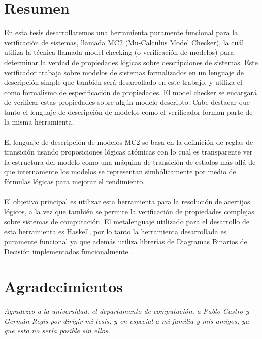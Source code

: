 % 
% 
%
\chapter*{Resumen}

\noindent En esta tesis desarrollaremos una herramienta puramente funcional para la verificación de sistemas, llamada MC2 (Mu-Calculus Model Checker), la cuál utiliza la técnica llamada model checking (o verificación de modelos) para determinar la verdad de propiedades lógicas sobre descripciones de sistemas. Este verificador trabaja sobre modelos de sistemas formalizados en un lenguaje de descripción simple que también será desarrollado en este trabajo, y utiliza el {\mucalculo} como formalismo de especificación de propiedades. El model checker se encargará de verificar estas propiedades sobre algún modelo descripto. Cabe destacar que tanto el lenguaje de descripción de modelos como el verificador forman parte de la misma herramienta.\\
\\
\noindent El lenguaje de descripción de modelos MC2 se basa en la definición de reglas de transición usando proposiciones lógicas atómicas con lo cual es transparente ver la estructura del modelo como una máquina de transición de estados más allá de que internamente los modelos se representan  simbólicamente por medio de fórmulas lógicas para mejorar el rendimiento.\\
\\
\noindent El objetivo principal es utilizar esta herramienta para la resolución de acertijos lógicos, a la vez que también se permite la verificación de propiedades complejas sobre sistemas de computación. El metalenguaje utilizado para el desarrollo de esta herramienta es Haskell, por lo tanto la herramienta desarrollada es puramente funcional ya que además utiliza librerías de Diagramas Binarios de Decisión implementados funcionalmente \cite{Waldmann:6}.


\chapter*{Agradecimientos}
{\sl Agradezco a la universidad, el departamento de computación, a Pablo Castro y Germán Regis por dirigir mi tesis, y en especial a mi familia y mis amigos, ya que esto no sería posible sin ellos.}

